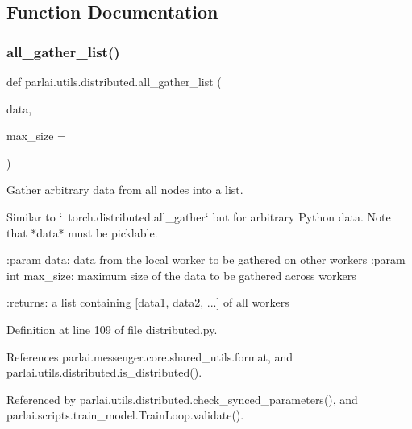 \subsection{Function Documentation}
\mbox{\label{namespaceparlai_1_1utils_1_1distributed_a9ef5bf0debf512ddbeb045327bfd87ef}} 
\subsubsection{\texorpdfstring{all\+\_\+gather\+\_\+list()}{all\_gather\_list()}}
{\footnotesize\ttfamily def parlai.\+utils.\+distributed.\+all\+\_\+gather\+\_\+list (\begin{DoxyParamCaption}\item[{}]{data,  }\item[{}]{max\+\_\+size = {} }\end{DoxyParamCaption})}

\begin{DoxyVerb}Gather arbitrary data from all nodes into a list.

Similar to `~torch.distributed.all_gather` but for arbitrary Python
data. Note that *data* must be picklable.

:param data:
    data from the local worker to be gathered on other workers
:param int max_size:
    maximum size of the data to be gathered across workers

:returns:
    a list containing [data1, data2, ...] of all workers
\end{DoxyVerb}
 

Definition at line 109 of file distributed.\+py.



References parlai.\+messenger.\+core.\+shared\+\_\+utils.\+format, and parlai.\+utils.\+distributed.\+is\+\_\+distributed().



Referenced by parlai.\+utils.\+distributed.\+check\+\_\+synced\+\_\+parameters(), and parlai.\+scripts.\+train\+\_\+model.\+Train\+Loop.\+validate().

